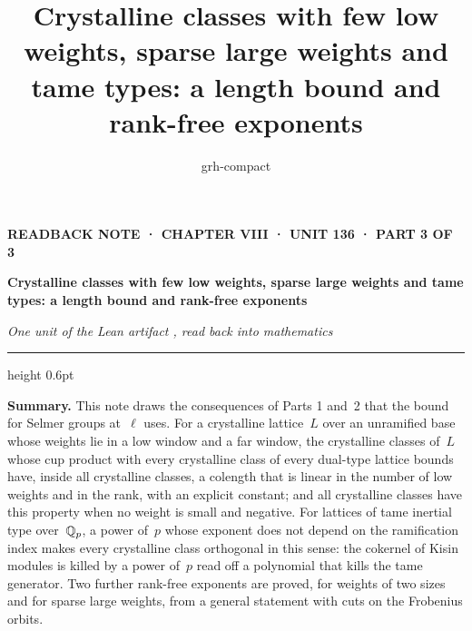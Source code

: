 \documentclass[11pt,a4paper]{article}
\title{Crystalline classes with few low weights, sparse large weights and tame types: a length bound and rank-free exponents}
\author{grh-compact}
\date{}
\theoremstyle{plainx}
\theoremstyle{uprightx}
\begin{document}
\color{ink}

{\raggedright
{\sffamily\bfseries\fontsize{7.2}{9}\selectfont\color{leancol}READBACK NOTE · CHAPTER VIII · UNIT 136 · PART 3 OF 3\par}
\vspace{5pt}
{\fontsize{21.5}{25.5}\selectfont\bfseries Crystalline classes with few low weights, sparse large weights and tame types: a length bound and rank-free exponents\par}
\vspace{5pt}
{\fontsize{12.4}{16}\selectfont\itshape\color{inksoft} One unit of the Lean artifact \ArtifactName, read back into
mathematics\par}}
\vspace{8pt}
{\color{rulegrey}\hrule height 0.6pt}
\vspace{7pt}
\thispagestyle{empty}

\textbf{Summary.} This note draws the consequences of Parts 1 and~2 that the bound for Selmer groups at~$\ell$
uses. For a crystalline lattice~$L$ over an unramified base whose weights lie in a low window and a far window,
the crystalline classes of~$L$ whose cup product with every crystalline class of every dual-type lattice
bounds have, inside all crystalline classes, a colength that is linear in the number of low weights and in the
rank, with an explicit constant; and all crystalline classes have this property when no weight is small and
negative. For lattices of tame inertial type over~$\mathbb{Q}_p$, a power of~$p$ whose exponent does not depend on the
ramification index makes every crystalline class orthogonal in this sense: the cokernel of Kisin modules is
killed by a power of~$p$ read off a polynomial that kills the tame generator. Two further rank-free exponents
are proved, for weights of two sizes and for sparse large weights, from a general statement with cuts on the
Frobenius orbits.
\end{document}
